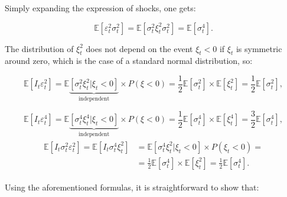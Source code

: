 \documentclass[authoryear, 1p]{elsarticle}
\numberwithin{equation}{section}
\begin{document}
\begin{pot}
Simply expanding the expression of shocks, one gets:

\begin{equation}\label{eq:r5}
\mathbb{E}\left[\varepsilon_{t}^{2}\sigma_{t}^{2}\right]=\mathbb{E}\left[\sigma^{2}_{t}\xi^{2}_{t}\sigma_{t}^{2}\right]=\mathbb{E}\left[\sigma_{t}^4\right].
\end{equation}

The distribution of $\xi^2_{t}$ does not depend on the event $\xi_{t}<0$ if $\xi_{t}$ is symmetric around zero, which is the case of a standard normal distribution, so:

\begin{equation}\label{eq:r6}
\mathbb{E}\left[I_{t}\varepsilon_{t}^{2}\right]=\mathbb{E}\underbrace{\left[\sigma_{t}^2\xi_{t}^2|\xi_{t} < 0\right]}_{\text{independent}} \times P\left(\xi < 0\right)=\frac{1}{2}\mathbb{E}\left[\sigma^2_{t}\right] \times \mathbb{E}\left[\xi^2_{t}\right]=\frac{1}{2}\mathbb{E}\left[\sigma^2_{t}\right],
\end{equation}

\begin{equation}\label{eq:r7}
\mathbb{E}\left[I_{t}\varepsilon_{t}^{4}\right]=\mathbb{E}\underbrace{\left[\sigma_{t}^4\xi_{t}^4|\xi_{t} < 0\right]}_{\text{independent}}\times P\left(\xi < 0\right)=\frac{1}{2}\mathbb{E}\left[\sigma^4_{t}\right] \times \mathbb{E}\left[\xi^4_{t}\right]=\frac{3}{2}\mathbb{E}\left[\sigma^4_{t}\right],
\end{equation}
\begin{align}\label{eq:r8}
\begin{split}
\mathbb{E}\left[I_{t} \sigma_{t}^2 \varepsilon_{t}^2\right] = \mathbb{E}\left[I_{t} \sigma_{t} ^ 4 \xi_{t} ^ 2\right] & = \mathbb{E}\left[\sigma_{t} ^ 4 \xi_{t} ^ 2|\xi_{t} < 0\right] \times P\left(\xi_{t} < 0\right)= \\ 
& = \frac{1}{2}\mathbb{E}\left[\sigma_{t} ^ 4\right] \times \mathbb{E}\left[\xi_{t} ^ 2\right]=\frac{1}{2}\mathbb{E}\left[\sigma_{t} ^ 4\right].
\end{split}
\end{align}

Using the aforementioned formulas, it is straightforward to show that:


\end{pot}
\end{document}
